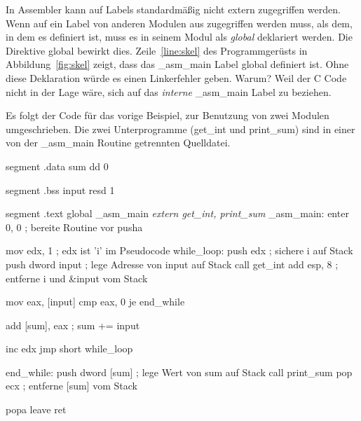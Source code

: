 In Assembler kann auf Labels standardm\"{a}{\ss}ig nicht extern zugegriffen
werden. Wenn auf ein Label von anderen Modulen aus zugegriffen
werden muss, als dem, in dem es definiert ist, muss es in seinem
Modul als \emph{global} deklariert werden. Die Direktive {\code
global}  bewirkt dies. Zeile~\ref{line:skel}
des Programmger\"{u}sts in Abbildung~\ref{fig:skel} zeigt, dass das
{\code \_asm\_main} Label global definiert ist. Ohne diese
Deklaration w\"{u}rde es einen Linkerfehler geben. Warum? Weil der C
Code nicht in der Lage w\"{a}re, sich auf das \emph{interne} {\code
\_asm\_main} Label zu beziehen.

Es folgt der Code f\"{u}r das vorige Beispiel, zur Benutzung von zwei
Modulen umgeschrieben. Die zwei Unterprogramme ({\code get\_int} und
{\code print\_sum}) sind in einer von der {\code \_asm\_main}
Routine getrennten Quelldatei.

\begin{AsmCodeListing}[label=main4.asm, numbers=left, commandchars=\\\{\}]

 segment .data
 sum     dd   0

 segment .bss
 input   resd 1

 segment .text
         global  _asm_main
\textit{         extern  get_int, print_sum}
 _asm_main:
         enter   0, 0              ; bereite Routine vor
         pusha

         mov     edx, 1            ; edx ist 'i' im Pseudocode
 while_loop:
         push    edx               ; sichere i auf Stack
         push    dword input       ; lege Adresse von input auf Stack
         call    get_int
         add     esp, 8            ; entferne i und &input vom Stack

         mov     eax, [input]
         cmp     eax, 0
         je      end_while

         add     [sum], eax        ; sum += input

         inc     edx
         jmp     short while_loop

 end_while:
         push    dword [sum]       ; lege Wert von sum auf Stack
         call    print_sum
         pop     ecx               ; entferne [sum] vom Stack

         popa
         leave
         ret
\end{AsmCodeListing}

